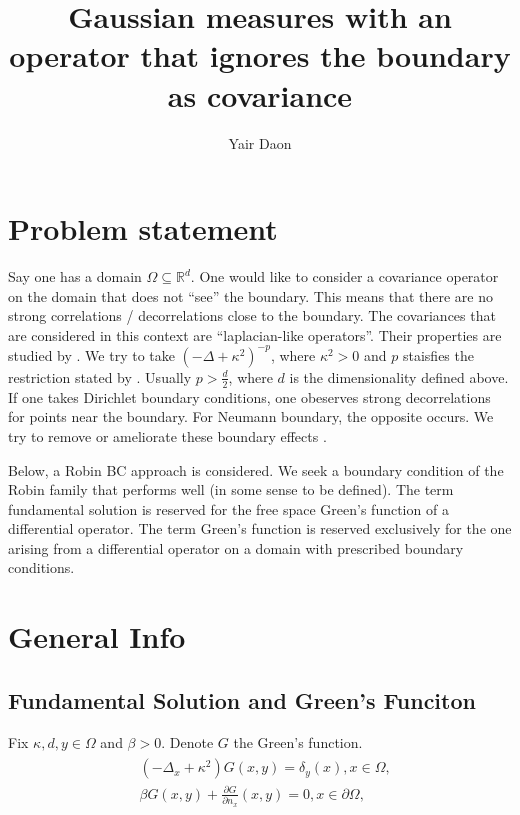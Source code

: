 \documentclass[paper=a4, fontsize=11pt]{scrartcl} %
\title{Gaussian measures with an operator that ignores the boundary as covariance}
\author{Yair Daon}
\date{}
\numberwithin{equation}{section} %
\numberwithin{figure}{section} %
\numberwithin{table}{section} %
\begin{document}
\maketitle
\begin{abstract}
\end{abstract}

\section{Problem statement}
Say one has a domain $\Omega \subseteq \mathbb{R}^d$. One would like to consider a covariance operator on the domain 
that does not ``see'' the boundary. This means that there are no strong correlations / decorrelations close to
the boundary. The covariances that are considered in this context are ``laplacian-like operators''. Their properties
are studied by \cite{stuart2010inverse}.
We try to take $(-\Delta + \kappa^2 )^{-p}$, where $\kappa^2 > 0$
and $p$ staisfies the restriction stated by \cite{stuart2010inverse}. Usually $p > \frac{d}{2}$,
where $d$ is the dimensionality defined above. If one takes Dirichlet boundary conditions, one obeserves 
strong decorrelations for points near the boundary. For Neumann boundary, the opposite occurs. We try 
to remove or ameliorate these boundary effects \cite{bui2013computational}.

Below, a Robin BC approach is considered. We seek a boundary condition of the Robin family that performs well (in some sense to be defined).
The term fundamental solution is reserved for the free space Green's function of a differential operator. The term Green's function 
is reserved exclusively for the one arising from a differential operator on a domain with prescribed boundary conditions.

\section{General Info}

\subsection{Fundamental Solution and Green's Funciton}
Fix $\kappa,d, y\in \Omega$ and $\beta > 0$. Denote $G$ the Green's function. 
\begin{align}
  \begin{split}
    &(-\Delta_{x} + \kappa^2 ) G(x,y) = \delta_{y}(x),  x \in  \Omega, \\
    &\beta G(x,y) + \frac{\partial G}{\partial n_{x}}(x,y) = 0, x \in \partial \Omega, 
  \end{split}
\end{align}
\end{document}
